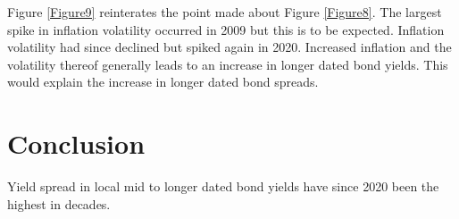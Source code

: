 \documentclass[11pt,preprint, authoryear]{elsarticle}
\numberwithin{equation}{section}
\numberwithin{figure}{section}
\numberwithin{table}{section}
\begin{document}
Figure \ref{Figure9} reinterates the point made about Figure
\ref{Figure8}. The largest spike in inflation volatility occurred in
2009 but this is to be expected. Inflation volatility had since declined
but spiked again in 2020. Increased inflation and the volatility thereof
generally leads to an increase in longer dated bond yields. This would
explain the increase in longer dated bond spreads.

\hypertarget{conclusion}{%
\section{Conclusion}\label{conclusion}}

Yield spread in local mid to longer dated bond yields have since 2020
been the highest in decades.


\end{document}
